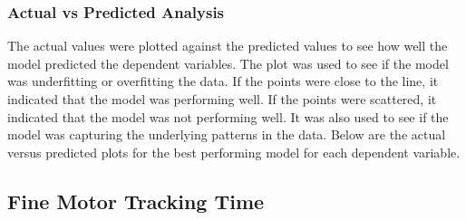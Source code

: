 \subsubsection{Actual vs Predicted Analysis}
The actual values were plotted against the predicted values to see how well the model predicted the
dependent variables. The plot was used to see if the model was underfitting or overfitting the data. If the points were close to the line, it indicated that the model was performing well.
If the points were scattered, it indicated that the model was not performing well. It was also used to see if the model was capturing the underlying patterns in the data. Below are the
actual versus predicted plots for the best performing model for each dependent variable.

\subsection*{Fine Motor Tracking Time}

